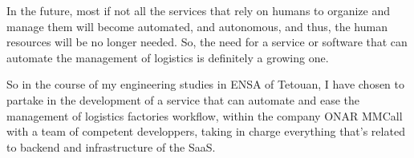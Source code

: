 In the future, most if not all the services that rely on humans to organize and manage them will become automated,
and autonomous, and thus, the human resources will be no longer needed.
So, the need for a service or software that can automate the management of logistics is definitely a growing one.

So in the course of my engineering studies in ENSA of Tetouan, I have chosen to partake in the development of a
service that can automate and ease the management of logistics factories workflow, within the company ONAR MMCall
with a team of competent developpers, taking in charge everything that's related to backend and infrastructure of
the SaaS\@.
